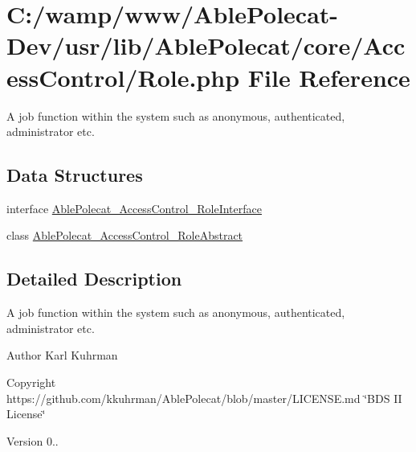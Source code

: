 \hypertarget{_role_8php}{}\section{C\+:/wamp/www/\+Able\+Polecat-\/\+Dev/usr/lib/\+Able\+Polecat/core/\+Access\+Control/\+Role.php File Reference}
\label{_role_8php}


A job function within the system such as \textquotesingle{}anonymous\textquotesingle{}, \textquotesingle{}authenticated\textquotesingle{}, \textquotesingle{}administrator\textquotesingle{} etc.  


\subsection*{Data Structures}
\begin{DoxyCompactItemize}
\item 
interface \hyperlink{interface_able_polecat___access_control___role_interface}{Able\+Polecat\+\_\+\+Access\+Control\+\_\+\+Role\+Interface}
\item 
class \hyperlink{class_able_polecat___access_control___role_abstract}{Able\+Polecat\+\_\+\+Access\+Control\+\_\+\+Role\+Abstract}
\end{DoxyCompactItemize}


\subsection{Detailed Description}
A job function within the system such as \textquotesingle{}anonymous\textquotesingle{}, \textquotesingle{}authenticated\textquotesingle{}, \textquotesingle{}administrator\textquotesingle{} etc. 

\begin{DoxyAuthor}{Author}
Karl Kuhrman 
\end{DoxyAuthor}
\begin{DoxyCopyright}{Copyright}
https\+://github.com/kkuhrman/\+Able\+Polecat/blob/master/\+L\+I\+C\+E\+N\+S\+E.\+md \char`\"{}\+B\+D\+S I\+I License\char`\"{} 
\end{DoxyCopyright}
\begin{DoxyVersion}{Version}
0.. 
\end{DoxyVersion}
